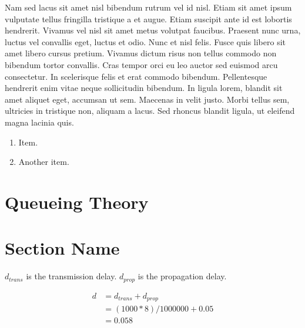 \documentclass[fleqn,11pt]{article}
\begin{document}
Nam sed lacus sit amet nisl bibendum rutrum vel id nisl. Etiam sit
amet ipsum vulputate tellus fringilla tristique a et augue. Etiam
suscipit ante id est lobortis hendrerit. Vivamus vel nisl sit amet
metus volutpat faucibus. Praesent nunc urna, luctus vel convallis
eget, luctus et odio. Nunc et nisl felis. Fusce quis libero sit amet
libero cursus pretium. Vivamus dictum risus non tellus commodo non
bibendum tortor convallis. Cras tempor orci eu leo auctor sed euismod
arcu consectetur. In scelerisque felis et erat commodo
bibendum. Pellentesque hendrerit enim vitae neque sollicitudin
bibendum. In ligula lorem, blandit sit amet aliquet eget, accumsan ut
sem. Maecenas in velit justo. Morbi tellus sem, ultricies in tristique
non, aliquam a lacus. Sed rhoncus blandit ligula, ut eleifend magna
lacinia quis.

\begin{enumerate}

\item Item.

\item Another item.

\end{enumerate}

\section{Queueing Theory}




\section{Section Name}

$d_{trans}$ is the transmission delay. $d_{prop}$ is the propagation delay.

\begin{align*}
d &= d_{trans} + d_{prop}\\
  &= (1000*8)/1000000 + 0.05\\
  &= 0.058
\end{align*}
\end{document}
